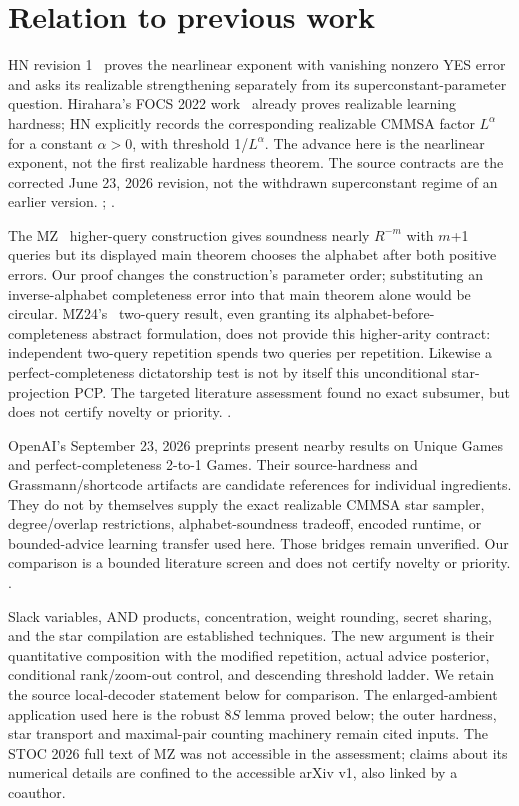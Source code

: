 \section{Relation to previous work}\label{sec:2}
HN revision 1~\cite{HN} proves the nearlinear exponent with vanishing nonzero YES error and asks its realizable strengthening separately from its superconstant-parameter question. Hirahara's FOCS 2022 work~\cite{Hir22} already proves realizable learning hardness; HN explicitly records the corresponding realizable CMMSA factor \(L^\alpha\) for a constant \(\alpha\)\(>\)0, with threshold 1/\(L^\alpha\). The advance here is the nearlinear exponent, not the first realizable hardness theorem. The source contracts are the corrected June 23, 2026 revision, not the withdrawn superconstant regime of an earlier version. \cite[Definitions 1.2/1.7, Theorems 1.3/1.8, Section 7]{HN}; \cite{Hir22}.

The MZ~\cite{MZ} higher-query construction gives soundness nearly \(R^{-m}\) with \(m\)+1 queries but its displayed main theorem chooses the alphabet after both positive errors. Our proof changes the construction's parameter order; substituting an inverse-alphabet completeness error into that main theorem alone would be circular. MZ24's~\cite{MZ24} two-query result, even granting its alphabet-before-completeness abstract formulation, does not provide this higher-arity contract: independent two-query repetition spends two queries per repetition. Likewise a perfect-completeness dictatorship test is not by itself this unconditional star-projection PCP. The targeted literature assessment found no exact subsumer, but does not certify novelty or priority. \cite{MZ,MZ24,BKM}.

OpenAI's September 23, 2026 preprints present nearby results on Unique Games and perfect-completeness 2-to-1 Games. Their source-hardness and Grassmann/shortcode artifacts are candidate references for individual ingredients. They do not by themselves supply the exact realizable CMMSA star sampler, degree/overlap restrictions, alphabet-soundness tradeoff, encoded runtime, or bounded-advice learning transfer used here. Those bridges remain unverified. Our comparison is a bounded literature screen and does not certify novelty or priority. \cite{OAIUG,OAI2to1}.

Slack variables, AND products, concentration, weight rounding, secret sharing, and the star compilation are established techniques. The new argument is their quantitative composition with the modified repetition, actual advice posterior, conditional rank/zoom-out control, and descending threshold ladder. We retain the source local-decoder statement below for comparison. The enlarged-ambient application used here is the robust 8\(S\) lemma proved below; the outer hardness, star transport and maximal-pair counting machinery remain cited inputs. The STOC 2026 full text of MZ was not accessible in the assessment; claims about its numerical details are confined to the accessible arXiv v1, also linked by a coauthor.

